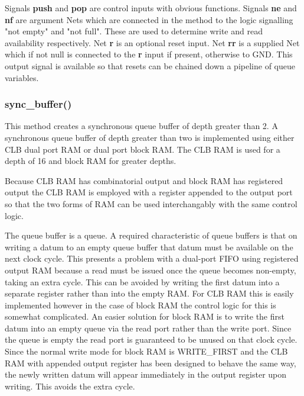         Signals {\bf push} and {\bf pop} are control inputs with obvious
        functions. Signals {\bf ne} and {\bf nf} are argument Nets which
        are connected in the method to the logic signalling "not empty"
        and "not full". These are used to determine write and read
        availability respectively. Net {\bf r} is an optional reset
        input. Net {\bf rr} is a supplied Net which if not null
        is connected to the {\bf r} input if present, otherwise to GND.
        This output signal is available so that resets can be chained
        down a pipeline of queue variables.


    \subsubsection{sync\_buffer()}

        This method creates a synchronous queue buffer of depth greater
        than 2.
        A synchronous queue buffer of depth greater than two is
        implemented using either CLB dual port RAM or dual port
        block RAM. The CLB RAM is used for a depth of 16 and block
        RAM for greater depths.

        Because CLB RAM has combinatorial output and block RAM
        has registered output the CLB RAM is employed with a
        register appended to the output port so that the two
        forms of RAM can be used interchangably with the same
        control logic.

        The queue buffer is a queue. A required characteristic of
        queue buffers is that on writing a datum to an empty queue
        buffer that datum must be available on the next clock cycle.
        This presents a problem with a dual-port FIFO using
        registered output RAM because a read must be issued once the
        queue becomes non-empty, taking an extra cycle. This can be
        avoided by writing the first datum into a separate register
        rather than into the empty RAM. For CLB RAM this is easily
        implemented however in the case of block RAM the control
        logic for this is somewhat complicated. An easier solution
        for block RAM is to write the first datum into an empty
        queue via the read port rather than the write port. Since
        the queue is empty the read port is guaranteed to be unused
        on that clock cycle. Since the normal write mode for block
        RAM is WRITE\_FIRST and the CLB RAM with appended output
        register has been designed to behave the same way, the newly
        written datum will appear immediately in the output register
        upon writing. This avoids the extra cycle.


